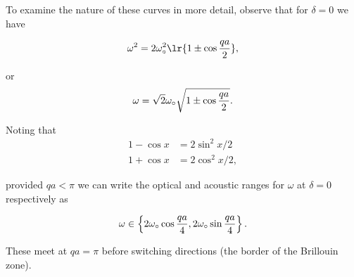 {To examine the nature of these curves in more detail, observe that for \(\delta = 0\) we have

\begin{dmath}\label{eqn:condensedMatterProblemSet4Problem2:820}
\omega^2 = 2 \omega_\nought^2 \lr{ 1 \pm \cos \frac{qa}{2} },
\end{dmath}

or
\begin{dmath}\label{eqn:condensedMatterProblemSet4Problem2:840}
\omega = \sqrt{2} \omega_\nought \sqrt{ 1 \pm \cos \frac{qa}{2} }.
\end{dmath}

Noting that
\begin{equation}\label{eqn:condensedMatterProblemSet4Problem2:860}
\begin{aligned}
1 - \cos x &= 2 \sin^2 x/2 \\
1 + \cos x &= 2 \cos^2 x/2,
\end{aligned}
\end{equation}

provided \(qa < \pi\) we can write the optical and acoustic ranges for \(\omega\) at \(\delta = 0\) respectively as

\begin{dmath}\label{eqn:condensedMatterProblemSet4Problem2:880}
\omega \in \left\{
2 \omega_\nought \cos \frac{qa}{4},
2 \omega_\nought \sin \frac{qa}{4}
 \right\}.
\end{dmath}

These meet at \(qa = \pi\) before switching directions (the border of the Brillouin zone).
}
